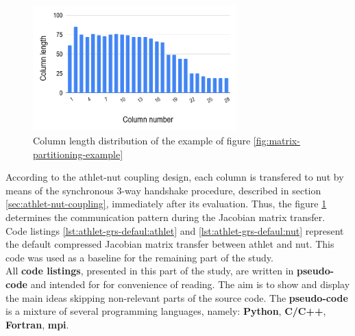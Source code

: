 \begin{figure}[htpb]
  \centering
  \includegraphics[width=0.7\textwidth]{figures/matrix-compression-2.png}
  \caption{Column length distribution of the example of figure \ref{fig:matrix-partitioning-example}} \label{fig:matrix-column-distribution}
\end{figure}


According to the \gls{athlet}-\gls{nut} coupling design, each column is transfered to \gls{nut} by means of the synchronous 3-way handshake procedure, described in section \ref{sec:athlet-nut-coupling}, immediately after its evaluation. Thus, the figure \ref{fig:matrix-column-distribution} determines the communication pattern during the Jacobian matrix transfer.\\


Code listings \ref{lst:athlet-grs-defaul:athlet} and \ref{lst:athlet-grs-defaul:nut} represent the default compressed Jacobian matrix transfer between \gls{athlet} and \gls{nut}. This code was used as a baseline for the remaining part of the study.\\


All \textbf{code listings}, presented in this part of the study, are written in \textbf{pseudo-code} and intended for for convenience of reading. The aim is to show and display the main ideas skipping non-relevant parts of the source code. The \textbf{pseudo-code} is a mixture of several programming languages, namely: \textbf{Python}, \textbf{C/C++}, \textbf{Fortran}, \textbf{\gls{mpi}}.\\


